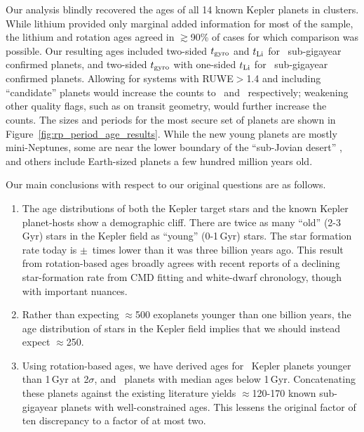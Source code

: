 \documentclass[11pt,twocolumn,tighten]{aastex63}
\begin{document}
Our analysis blindly recovered the ages of all 14 known Kepler planets
in clusters.  While lithium provided only marginal added information
for most of the sample, the lithium and rotation ages agreed in
$\gtrsim$90\% of cases for which comparison was possible.
Our resulting ages included two-sided $t_{\rm gyro}$ and $t_{\rm Li}$
for \ltonegyrhighqconfirmedtwosided\ sub-gigayear confirmed planets, and
two-sided $t_{\rm gyro}$ with one-sided $t_{\rm Li}$ for
\ltonegyrhighqconfirmedonesided\ sub-gigayear confirmed planets.  Allowing for
systems with RUWE$>$1.4 and including ``candidate'' planets
would increase the counts to
\ltonegyrmediumqconfirmedtwosided\ and
\ltonegyrmediumqconfirmedonesided\ respectively; weakening other quality flags,
such as on transit geometry, would further increase the counts.  The sizes and
periods for the most secure set of planets are shown in
Figure~\ref{fig:rp_period_age_results}.   While the new young planets are
mostly mini-Neptunes, some are near the lower boundary of the
``sub-Jovian desert'' \citep{Owen2018}, and others include Earth-sized 
planets a few hundred million years old.  

Our main conclusions with respect to our original questions are
as follows.

\begin{enumerate}[leftmargin=*,topsep=0pt,itemsep=-1ex,partopsep=1ex,parsep=1ex]
  \item The age distributions of both the Kepler target stars and the
    known Kepler planet-hosts show a demographic cliff.  There are
    twice as many ``old'' (2-3\,Gyr) stars in the
    Kepler field as ``young'' (0-1\,Gyr) stars.  The star formation
    rate today is \ratiosfr$\pm$\uncratiosfr\ times lower than it was
    three billion years ago.
    This result from rotation-based ages broadly agrees with recent reports of
    a declining star-formation rate
    from CMD fitting and white-dwarf chronology, though with
    important nuances.
  \item Rather than expecting $\approx$500 exoplanets younger than one
    billion years, the age distribution of stars in the
    Kepler field implies that we should instead expect $\approx$250.
  \item Using rotation-based ages, we have derived ages for
    \nplyounggyrotwosigma\ Kepler planets younger than 1\,Gyr at 2$\sigma$,
    and \nplyounggyro\ planets with median ages below 1\,Gyr.
    Concatenating these planets against the existing literature yields
    $\approx$120-170 known sub-gigayear planets with well-constrained
    ages.  This lessens the original factor of ten discrepancy to
    a factor of at most two.
\end{enumerate}
\end{document}
